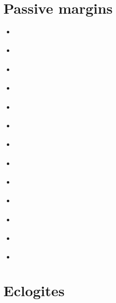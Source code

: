 \section{Passive margins} 

\begin{scriptsize}
\begin{itemize}
\item[\nineteeneightytwo] 
\textcite{clwv82} 
\item[\nineteeneightysix] 
\textcite{lies86} 
\item[\twothousandfive] 
\textcite{gebi05} 
\item[\twothousandeight] 
\textcite{clbz08} 
\textcite{kasb08} 
\item[\twothousandten] 
\textcite{fasm10} 
\textcite{nigm10} 
\item[\twothousandeleven] 
\textcite{rapy11} 
\textcite{nigm11} 
\textcite{brfo11} 
\item[\twothousandthirteen] 
\textcite{mana13} 
\textcite{yahb13} 
\item[\twothousandfourteen] 
\textcite{macg14} 
\item[\twothousandfifteen] 
\textcite{gebw15} 
\textcite{nigo15} 
\item[\twothousandsixteen] 
\textcite{dupm16} 
\item[\twothousandeighteen] 
\textcite{sahf18} 
\textcite{mube18} 
\textcite{tebu18} 
\item[\twothousandnineteen] 
\textcite{zhli19} 
\item[\twothousandtwentyone] 
\textcite{auws21} 
\end{itemize}
\end{scriptsize}

\section{Eclogites} 

